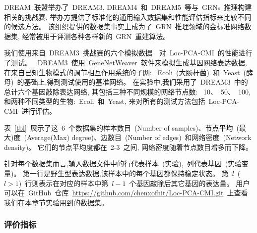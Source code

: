 DREAM~联盟举办了~DREAM3,
DREAM4~和~DREAM5~等与~GRNs~推理构建相关的挑战赛, 
举办方提供了标准化的通用输入数据集和性能评估指标来比较不同的候选方法。
该组织提供的数据集事实上成为了~GRN~推理领域的金标准网络数据集,
经常被用于评测各种各样新的~GRN~重建算法。

我们使用来自~DREAM3~挑战赛的六个模拟数据~\cite{schaffter2011genenetweaver}~对~Loc-PCA-CMI~的性能进行了测试。
~DREAM3~使用~GeneNetWeaver~软件来模拟生成基因网络表达数据,
在来自已知生物模式的调节相互作用系统的子网:
~Ecoli~(大肠杆菌)~和~Yeast~(酵母)~的基础上,得到测试使用的基准网络。 
在实验中,我们采用了~DREAM3~中的总计六个基因敲除表达网络,
其包括三种不同规模的网络节点数:
~10、~50、~100, 和两种不同类型的生物:~Ecoli~和~Yeast, 
来对所有的测试方法包括~Loc-PCA-CMI~进行评估。

表~\ref{tbl}~展示了这~6~个数据集的样本数目~(Number of samples)、节点平均~(最大)度~(Average(Max) degree)、边数目~(Number of edges)~和网络密度~(Network density)。
它们的节点平均度都在~2-3~之间, 网络密度随着节点数目增多而下降。
\begin{table} [!htbp]
\caption{实验所使用的数据集描述} 
\label{tbl} 
\begin{center}
\end{center}
\end{table} 

针对每个数据集而言,输入数据文件中的行代表样本~(实验),~列代表基因~(实验变量)。
第一行是野生型表达数据,该样本中的每个基因都保持稳定状态。
第~$l$~($l>1$)~行则表示在对应的样本中第~$l-1$~个基因敲除后其它基因的表达量。
用户可以在~GitHub~仓库~\url{https://github.com/chenxofhit/Loc-PCA-CMI.git}~上查看我们在本章节实验用到的数据集。

\subsubsection{评价指标}

